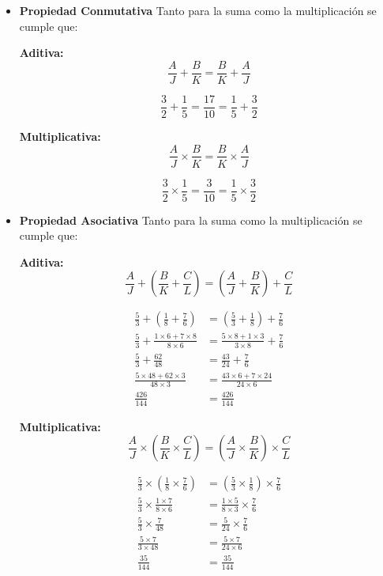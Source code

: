 \documentclass[12pt]{article}
\begin{document}
\begin{itemize}
    \item \textbf{Propiedad Conmutativa} Tanto para la suma como la
        multiplicación se cumple que:

        \textbf{Aditiva:}
        $$\frac{A}{J} +\frac{B}{K} = \frac{B}{K} +\frac{A}{J}$$

        $$ \frac{3}{2} +\frac{1}{5} = \frac{17}{10} = \frac{1}{5} +\frac{3}{2}$$

        \textbf{Multiplicativa:}
        $$ \frac{A}{J} \times\frac{B}{K} = \frac{B}{K} \times\frac{A}{J}$$

        $$ \frac{3}{2} \times\frac{1}{5} = \frac{3}{10} = \frac{1}{5} \times\frac{3}{2}$$

    \item \textbf{Propiedad Asociativa} Tanto para la suma como la
        multiplicación se cumple que:

        \textbf{Aditiva:}
        $$ \frac{A}{J}+\left(\frac{B}{K}+\frac{C}{L}\right)=\left(\frac{A}{J}+\frac{B}{K}\right)+\frac{C}{L}$$

        \begin{align*}
            \frac{5}{3} +\left(\frac{1}{8} +\frac{7}{6}\right) &=\left( \frac{5}{3} +\frac{1}{8}\right) +\frac{7}{6}\\
            \frac{5}{3} +\frac{1\times6+7\times8}{8\times6} &= \frac{5\times8+1\times3}{3\times8}+\frac{7}{6}\\
            \frac{5}{3} + \frac{62}{48} &= \frac{43}{24} +\frac{7}{6} \\
            \frac{5\times48+62\times3}{48\times3} &= \frac{43\times6+7\times24}{24\times6} \\
            \frac{426}{144} &= \frac{426}{144}
        \end{align*}

        \textbf{Multiplicativa:}
        $$\frac{A}{J}\times\left(\frac{B}{K}\times\frac{C}{L}\right)=\left(\frac{A}{J}\times\frac{B}{K}\right)\times\frac{C}{L} $$

        \begin{align*}
            \frac{5}{3}\times \left(\frac{1}{8}\times \frac{7}{6}\right)  &=\left( \frac{5}{3}\times \frac{1}{8}\right)\times \frac{7}{6}\\
            \frac{5}{3} \times \frac{1\times7}{8\times6} &= \frac{1\times5}{8\times3} \times \frac{7}{6} \\
            \frac{5}{3} \times \frac{7}{48} &= \frac{5}{24} \times  \frac{7}{6} \\
            \frac{5\times7}{3\times48} &= \frac{5\times 7}{24\times6} \\
            \frac{35}{144} &= \frac{35}{144}
        \end{align*}


\end{itemize}
\end{document}
